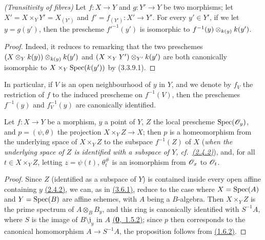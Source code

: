 \begin{prop}[3.6.4]
\label{prop-1.3.6.4}
\emph{(Transitivity of fibres)}
Let $f\colon X\to Y$ and $g\colon Y'\to Y$ be two morphisms; let $X'=X\times_Y Y'=X_{(Y')}$ and $f'=f_{(Y')}\colon X'\to Y'$.
For every $y'\in Y'$, if we let $y=g(y')$, then the prescheme $f'^{-1}(y')$ is isomorphic to $f^{-1}(y)\otimes_{k(y)}k(y')$.
\end{prop}

\begin{proof}
\label{proof-prop-1.3.6.4}
Indeed, it reduces to remarking that the two preschemes $(X\otimes_Yk(y))\otimes_{k(y)}k(y')$ and $(X\times_Y Y')\otimes_{Y'}k(y')$ are both canonically isomorphic to $X\times_Y{\mathop{\mathrm{Spec}}\nolimits}(k(y'))$ by (3.3.9.1).
\end{proof}

In particular, if $V$ is an open neighbourhood of $y$ in $Y$, and we denote by $f_V$ the restriction of $f$ to the induced prescheme on $f^{-1}(V)$, then the preschemes $f^{-1}(y)$ and $f^{-1}_V(y)$ are canonically identified.

\begin{prop}[3.6.5]
\label{prop-1.3.6.5}
Let $f\colon X\to Y$ be a morphism, $y$ a point of $Y$, $Z$ the local prescheme ${\mathop{\mathrm{Spec}}\nolimits}(\mathscr{O}_y)$, and $p=(\psi,\theta)$ the projection $X\times_Y Z\to X$; then $p$ is a homeomorphism from the underlying space of $X\times_Y Z$ to the subspace $f^{-1}(Z)$ of $X$ (\emph{when the underlying space of $Z$ is identified with a subspace of $Y$, cf.~\hyperref[prop-1.2.4.2]{(2.4.2)}}), and, for all $t\in X\times_Y Z$, letting $z=\psi(t)$, $\theta_t^\#$ is an isomorphism from $\mathscr{O}_x$ to $\mathscr{O}_t$.
\end{prop}

\begin{proof}
\label{proof-prop-1.3.6.5}
Since $Z$ (identified as a subspace of $Y$) is contained inside every open affine containing $y$ \hyperref[prop-1.2.4.2]{(2.4.2)}, we can, as in \hyperref[prop-1.3.6.1]{(3.6.1)}, reduce to the case where $X={\mathop{\mathrm{Spec}}\nolimits}(A)$ and $Y={\mathop{\mathrm{Spec}}\nolimits}(B)$ are affine schemes, with $A$ being a $B$-algebra.
Then $X\times_Y Z$ is the prime spectrum of $A\otimes_B B_y$, and this ring is canonically identified with $S^{-1}A$, where $S$ is the image of $B\setminus\mathfrak{j}_y$ in $A$ \hyperref[env-0.1.5.2]{(\textbf{0},~1.5.2)}; since $p$ then corresponds to the canonical homomorphism $A\to S^{-1}A$, the proposition follows from \hyperref[exm-1.1.6.2]{(1.6.2)}.
\end{proof}

